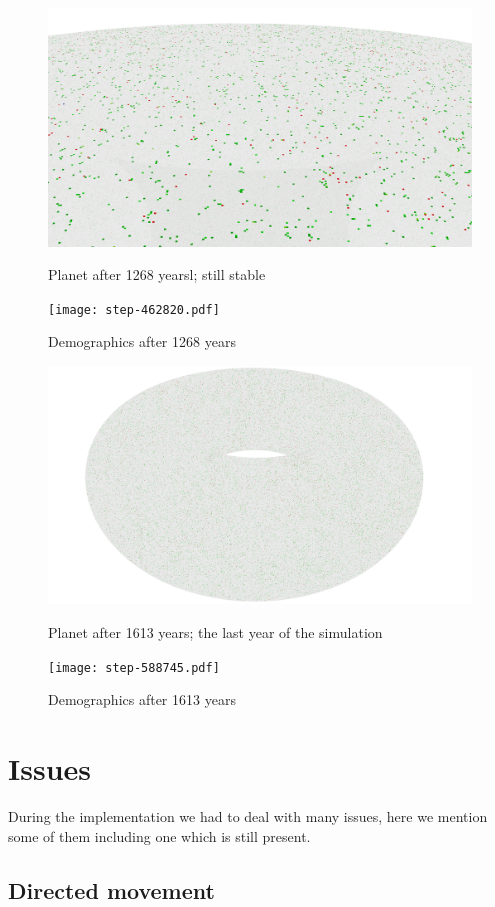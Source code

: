 \documentclass[a4paper]{article}
\begin{document}
\begin{figure}[pht]
    \centering
    \includegraphics[width=\textwidth]{torus/step-462820-torus.png}
    \caption{Planet after 1268 yearsl; still stable}
    \texttt{[image: step-462820.pdf]}
    \caption{Demographics after 1268 years}
\end{figure}

\begin{figure}[pht]
    \centering
    \includegraphics[width=\textwidth]{torus/step-588745-torus.png}
    \caption{Planet after 1613 years; the last year of the simulation}
    \texttt{[image: step-588745.pdf]}
    \caption{Demographics after 1613 years}
\end{figure}

\section{Issues}

During the implementation we had to deal with many issues, here we mention some of them including one which is still present.

\subsection{Directed movement}
\end{document}
